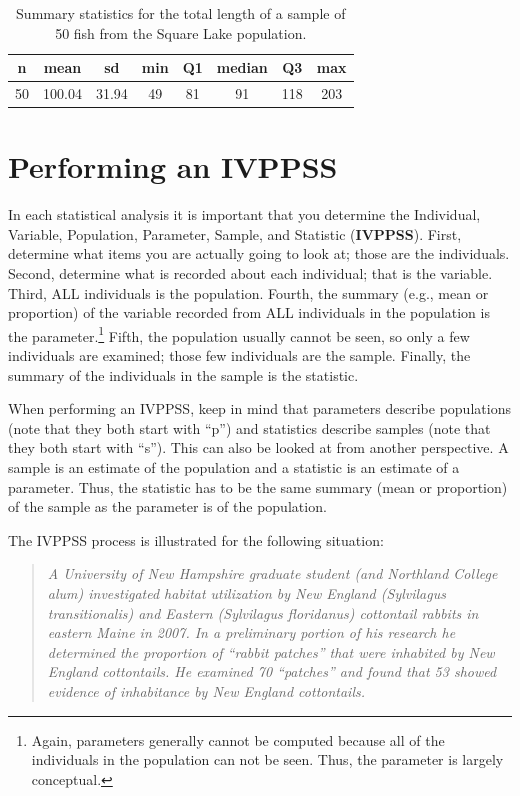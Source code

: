 \documentclass[10pt,openany]{book}\usepackage[]{graphicx}\usepackage[]{color}
\begin{document}
\begin{table}[ht]
\centering
\caption{Summary statistics for the total length of a sample of 50 fish from the Square Lake population.} 
\label{tab:SquareLakeSample1}
\begin{tabular}{cccccccc}
 n & mean & sd & min & Q1 & median & Q3 & max \\ 
  \hline
50 & 100.04 & 31.94 & 49 & 81 & 91 & 118 & 203 \\ 
   \hline
\end{tabular}
\end{table}



\vspace{-12pt}


\section{Performing an IVPPSS}
In each statistical analysis it is important that you determine the Individual, Variable, Population, Parameter, Sample, and Statistic (\textbf{IVPPSS}). First, determine what items you are actually going to look at; those are the individuals. Second, determine what is recorded about each individual; that is the variable. Third, ALL individuals is the population. Fourth, the summary (e.g., mean or proportion) of the variable recorded from ALL individuals in the population is the parameter.\footnote{Again, parameters generally cannot be computed because all of the individuals in the population can not be seen. Thus, the parameter is largely conceptual.} Fifth, the population usually cannot be seen, so only a few individuals are examined; those few individuals are the sample. Finally, the summary of the individuals in the sample is the statistic.

When performing an IVPPSS, keep in mind that parameters describe populations (note that they both start with ``p'') and statistics describe samples (note that they both start with ``s''). This can also be looked at from another perspective. A sample is an estimate of the population and a statistic is an estimate of a parameter. Thus, the statistic has to be the same summary (mean or proportion) of the sample as the parameter is of the population.

The IVPPSS process is illustrated for the following situation:
\vspace{-6pt}
\begin{quote}
\textit{A University of New Hampshire graduate student (and Northland College alum) investigated habitat utilization by New England (Sylvilagus transitionalis) and Eastern (Sylvilagus floridanus) cottontail rabbits in eastern Maine in 2007. In a preliminary portion of his research he determined the proportion of ``rabbit patches'' that were inhabited by New England cottontails. He examined 70 ``patches'' and found that 53 showed evidence of inhabitance by New England cottontails.}
\end{quote}
\vspace{-6pt}
\end{document}
